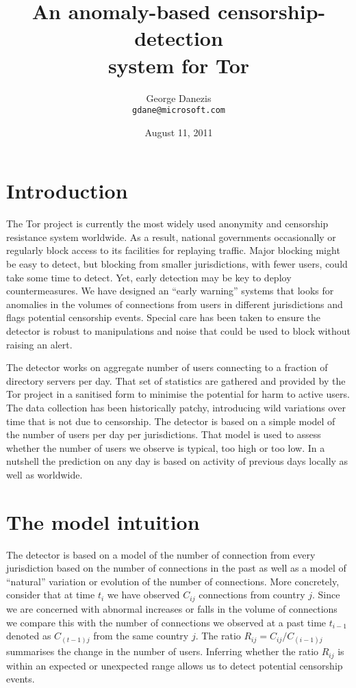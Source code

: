 \documentclass{article}
\begin{document}
\author{George Danezis\\{\tt gdane@microsoft.com}}
\title{An anomaly-based censorship-detection\\system for Tor}
\date{August 11, 2011}
\maketitle

\section{Introduction}

The Tor project is currently the most widely used anonymity and censorship
resistance system worldwide.
As a result, national governments occasionally or regularly block access
to its facilities for replaying traffic.
Major blocking might be easy to detect, but blocking from smaller
jurisdictions, with fewer users, could take some time to detect.
Yet, early detection may be key to deploy countermeasures.
We have designed an ``early warning'' systems that looks for anomalies in
the volumes of connections from users in different jurisdictions and flags
potential censorship events.
Special care has been taken to ensure the detector is robust to
manipulations and noise that could be used to block without raising an
alert.

The detector works on aggregate number of users connecting to a fraction
of directory servers per day.
That set of statistics are gathered and provided by the Tor project in a
sanitised form to minimise the potential for harm to active users.
The data collection has been historically patchy, introducing wild
variations over time that is not due to censorship.
The detector is based on a simple model of the number of users per day per
jurisdictions.
That model is used to assess whether the number of users we observe is
typical, too high or too low.
In a nutshell the prediction on any day is based on activity of previous
days locally as well as worldwide.

\section{The model intuition}

The detector is based on a model of the number of connection from every
jurisdiction based on the number of connections in the past as well as a
model of ``natural'' variation or evolution of the number of connections.
More concretely, consider that at time $t_i$ we have observed $C_{ij}$
connections from country $j$.
Since we are concerned with abnormal increases or falls in the volume of
connections we compare this with the number of connections we observed at
a past time $t_{i-1}$ denoted as $C_{(t-1)j}$ from the same country $j$.
The ratio $R_{ij} = C_{ij} / C_{(i-1)j}$ summarises the change in the
number of users.
Inferring whether the ratio $R_{ij}$ is within an expected or unexpected
range allows us to detect potential censorship events. 
\end{document}
